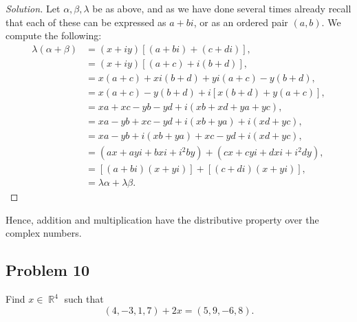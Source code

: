 \documentclass[letterpaper, 12pt]{amsart}
\DeclareMathOperator{\R}{\mathbb{R}}
\theoremstyle{definition}  %
\begin{document}
		\begin{proof}[Solution]
		Let $\alpha,\beta,\lambda$ be as above, and as we have done several times already recall that each of these can be expressed as $a + bi$, or as an ordered pair $(a,b)$.
		We compute the following:
			\begin{align*}
			\lambda(\alpha + \beta) &= (x + iy)[(a + bi) + (c + di)], \\
			&= (x + iy)[(a+c)+ i(b+d)], \\
			&= x(a + c) + xi(b + d) + yi(a + c) - y(b + d), \\
			&= x(a + c) - y(b + d) + i[x(b + d) + y(a + c)], \\
			&= xa + xc - yb - yd + i(xb + xd + ya + yc), \\
			&= xa - yb + xc - yd + i(xb + ya) + i(xd + yc), \\
			&= xa - yb + i(xb + ya) + xc - yd + i(xd + yc), \\
			&= (ax + ayi + bxi + i^{2}by) + (cx + cyi + dxi + i^{2}dy), \\
			&= [(a + bi)(x + yi)] + [(c + di)(x + yi)], \\
			&= \lambda \alpha + \lambda \beta.
			\end{align*}
			
		\end{proof}
		Hence, addition and multiplication have the distributive property over the complex numbers.

		\subsection*{Problem 10}
		Find $x \in \R^{4}$ such that $$(4, -3, 1, 7) + 2x = (5, 9, -6, 8).$$
\end{document}
